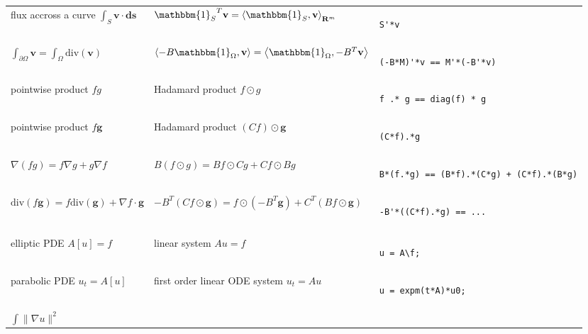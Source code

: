 \documentclass{article}
\def\R{\mathbf{R}}
\begin{document}
\begin{tabular}{l|l|b{}}
flux accross a curve $\int_{S}\mathbf{v}\cdot\mathbf{ds}$ &
${\mathbbm{1}_S}^T\mathbf{v} = \left\langle\mathbbm{1}_S,\mathbf{v}\right\rangle_{\R^m}$ &
\begin{verbatim}
S'*v
\end{verbatim}
\\
$\int_{\partial\Omega}\mathbf{v}=\int_\Omega\mathrm{div}(\mathbf{v})$ &
$\left\langle -B\mathbbm{1}_{\Omega},\mathbf{v}\right\rangle=\left\langle\mathbbm{1}_\Omega,-B^T\mathbf{v}\right\rangle$ &
\begin{verbatim}
(-B*M)'*v == M'*(-B'*v)
\end{verbatim}
\\
pointwise product $fg$ & Hadamard product $f\odot g$ &
\begin{verbatim}
f .* g == diag(f) * g
\end{verbatim}
\\
pointwise product $f\mathbf{g}$ & Hadamard product $(Cf)\odot\mathbf{g}$ &
\begin{verbatim}
(C*f).*g
\end{verbatim}
\\
$\nabla(fg)=f\nabla g+g\nabla f$ &
$B(f\odot g)= Bf\odot Cg+Cf\odot Bg$ &
\begin{verbatim}
B*(f.*g) == (B*f).*(C*g) + (C*f).*(B*g)
\end{verbatim}
\\
$\mathrm{div}(f\mathbf{g})=f\mathrm{div}(\mathbf{g})+\nabla f\cdot\mathbf{g}$ &
$-B^T(Cf\odot\mathbf{g})= f\odot (-B^T\mathbf{g})+C^T\left(Bf\odot\mathbf{g}\right)$ &
\begin{verbatim}
-B'*((C*f).*g) == ...
\end{verbatim}
\\
&&\\
elliptic PDE $A[u]=f$ &
linear system $Au=f$ &
\begin{verbatim}
u = A\f;
\end{verbatim}
\\
parabolic PDE $u_t=A[u]$ &
first order linear ODE system $u_t=Au$ &
\begin{verbatim}
u = expm(t*A)*u0;
\end{verbatim}
\\
$\int\|\nabla u\|^2$ &

\end{tabular}
\end{document}

